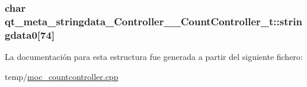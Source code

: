 \subsubsection[{\texorpdfstring{stringdata0}{stringdata0}}]{\setlength{\rightskip}{0pt plus 5cm}char qt\+\_\+meta\+\_\+stringdata\+\_\+\+Controller\+\_\+\+\_\+\+Count\+Controller\+\_\+t\+::stringdata0\mbox{[}74\mbox{]}}\hypertarget{structqt__meta__stringdata___controller_____count_controller__t_a5e9c416306462c2021b89c7efe00db12}{}\label{structqt__meta__stringdata___controller_____count_controller__t_a5e9c416306462c2021b89c7efe00db12}


La documentación para esta estructura fue generada a partir del siguiente fichero\+:\begin{DoxyCompactItemize}
\item 
temp/\hyperlink{moc__countcontroller_8cpp}{moc\+\_\+countcontroller.\+cpp}\end{DoxyCompactItemize}
